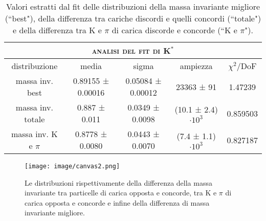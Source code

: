 \begin{table}[htp]
    \centering
    \begin{tabular}{||c|c|c|c|c||}
        \hline \hline
        \multicolumn{5}{||c||}{\textsc{analisi del fit di K$^*$}} \\
        \hline \hline
        distribuzione & media & sigma & ampiezza & $\chi^2/$DoF \\
        \hline
        massa inv. best & 0.89155 ± 0.00016 & 0.05084 ± 0.00012 & 23363 ± 91 & 1.47239\\
        massa inv. totale & 0.887 ± 0.011 & 0.0349 ± 0.0098 & (10.1 ± 2.4) $\cdot 10^3$ & 0.859503\\
        massa inv. K e $\pi$ & 0.8778 ± 0.0080 & 0.0443 ± 0.0070 & (7.4 ± 1.1) $\cdot 10^3$ & 0.827187\\
        \hline \hline 
    \end{tabular}
    \caption[\small Distribuzioni massa invariante]{\small Valori estratti dal fit delle distribuzioni della massa invariante migliore (“best"), della differenza tra cariche discordi e quelli concordi (“totale") e della differenza tra K e $\pi$ di carica discorde e concorde (“K e $\pi$").}
    \label{tab:massinv}
\end{table}

\begin{figure}[htbp]
    \centering
    \texttt{[image: image/canvas2.png]}
    \caption{\small Le distribuzioni rispettivamente della differenza della massa invariante tra particelle di carica opposta e concorde, tra K e $\pi$ di carica opposta e concorde e infine della differenza di massa invariante migliore.}
    \label{fig:canvas2}
\end{figure}